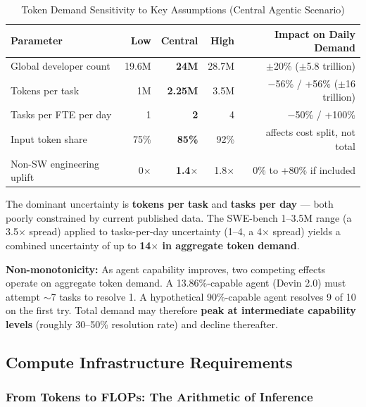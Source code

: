 \documentclass{article}
\begin{document}
\begin{table}[ht]
\centering
\caption{Token Demand Sensitivity to Key Assumptions (Central Agentic Scenario)}
\label{tab:sensitivity}
\small
\begin{tabular}{@{}lrrrr@{}}
\toprule
\textbf{Parameter} & \textbf{Low} & \textbf{Central} & \textbf{High} & \textbf{Impact on Daily Demand} \\
\midrule
Global developer count & 19.6M & \textbf{24M} & 28.7M & $\pm$20\% ($\pm$5.8 trillion) \\
Tokens per task & 1M & \textbf{2.25M} & 3.5M & $-$56\% / +56\% ($\pm$16 trillion) \\
Tasks per FTE per day & 1 & \textbf{2} & 4 & $-$50\% / +100\% \\
Input token share & 75\% & \textbf{85\%} & 92\% & affects cost split, not total \\
Non-SW engineering uplift & 0$\times$ & \textbf{1.4$\times$} & 1.8$\times$ & 0\% to +80\% if included \\
\bottomrule
\end{tabular}
\end{table}

The dominant uncertainty is \textbf{tokens per task} and \textbf{tasks per day} ---
both poorly constrained by current published data. The SWE-bench 1--3.5M range (a
3.5$\times$ spread) applied to tasks-per-day uncertainty (1--4, a 4$\times$ spread) yields
a combined uncertainty of up to \textbf{14$\times$ in aggregate token demand}.

\textbf{Non-monotonicity:} As agent capability improves, two competing effects operate
on aggregate token demand. A 13.86\%-capable agent (Devin 2.0) must attempt $\sim$7
tasks to resolve 1. A hypothetical 90\%-capable agent resolves 9 of 10 on the first try.
Total demand may therefore \textbf{peak at intermediate capability levels} (roughly
30--50\% resolution rate) and decline thereafter.

\subsection{Compute Infrastructure Requirements}
\label{sec:compute}

\subsubsection{From Tokens to FLOPs: The Arithmetic of Inference}
\end{document}
